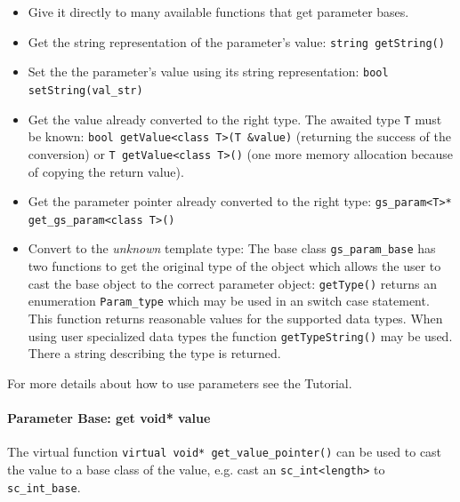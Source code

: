 \begin{itemize}

  \item Give it directly to many available functions that get parameter bases.

  \item Get the string representation of the parameter's value: \lstinline|string getString()|

  \item Set the the parameter's value using its string representation: \lstinline|bool setString(val_str)|

  \item Get the value already converted to the right type. The awaited type \lstinline|T| must be known: \newline
  	\lstinline|bool getValue<class T>(T &value)| (returning the success of the conversion) or \newline
	\lstinline|T getValue<class T>()| (one more memory allocation because of copying the return value).

  \item Get the parameter pointer already converted to the right type: \newline
  	\lstinline|gs_param<T>* get_gs_param<class T>()|

  \item Convert to the {\em unknown} template type: \newline
  	The base class \lstinline|gs_param_base| has two functions to get the original type of the object which allows the user to cast the base object to the correct parameter object: \lstinline|getType()| returns an enumeration \lstinline|Param_type| which may be used in an switch case statement. This function returns reasonable values for the supported data types. When using user specialized data types the function \lstinline|getTypeString()| may be used. There a string describing the type is returned.

\end{itemize}

For more details about how to use parameters see the \GreenConfig Tutorial.


\paragraph{Parameter Base: get void* value}
The virtual function
\lstinline|virtual void* get_value_pointer()|
can be used to cast the value to a base class of the value, e.g. cast an \lstinline|sc_int<length>| to \lstinline|sc_int_base|.

